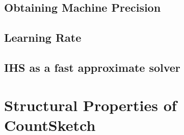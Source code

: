 \documentclass[twoside]{article}
\theoremstyle{definition}\newtheorem{thm}{Theorem}[section]
\theoremstyle{definition}\newtheorem{mydef}[thm]{Definition}
\theoremstyle{definition}\newtheorem{rem}[thm]{Remark}
\theoremstyle{definition}\newtheorem{prop}[thm]{Proposition}
\theoremstyle{definition}\newtheorem{example}[thm]{Example}
\theoremstyle{definition}\newtheorem{claim}[thm]{Claim}
\theoremstyle{definition}\newtheorem{Qu}[thm]{Question}
\theoremstyle{definition}\newtheorem{Lemma}[thm]{Lemma}
\theoremstyle{definition}\newtheorem{Cor}[thm]{Corollary}
\theoremstyle{definition}\newtheorem{Fact}[]{Fact}
\begin{document}
\subsection{Obtaining Machine Precision}

\subsection{Learning Rate}

\subsection{IHS as a fast approximate solver}


\appendix

\section{Structural Properties of CountSketch} \label{sec: countsketch-proofs}




\end{document}
